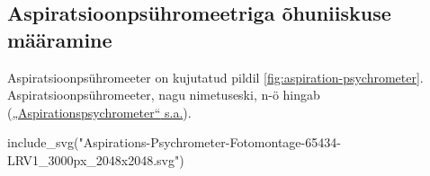 \documentclass[
  12pt,
  a4paper,
  onecolumn, twoside]{article}
\newenvironment{Shaded}{\begin{snugshade}}{\end{snugshade}}
\newcommand{\FunctionTok}[1]{\textcolor[rgb]{0.00,0.00,0.00}{#1}}
\newcommand{\NormalTok}[1]{#1}
\newcommand{\StringTok}[1]{\textcolor[rgb]{0.31,0.60,0.02}{#1}}
\begin{document}
\hypertarget{aspiratsioonpsuxfchromeetriga-uxf5huniiskuse-muxe4uxe4ramine}{%
\subsection{Aspiratsioonpsühromeetriga õhuniiskuse määramine}\label{aspiratsioonpsuxfchromeetriga-uxf5huniiskuse-muxe4uxe4ramine}}

Aspiratsioonpsühromeeter on kujutatud pildil \ref{fig:aspiration-psychrometer}. Aspiratsioonpsühromeeter, nagu nimetuseski, n-ö hingab (\protect\hyperlink{ref-aspirationspsychrometer}{{„Aspirationspsychrometer``} s.a.}).



\begin{Shaded}
\begin{Highlighting}[numbers=left,,]
\FunctionTok{include\_svg}\NormalTok{(}\StringTok{"Aspirations{-}Psychrometer{-}Fotomontage{-}65434{-}LRV1\_3000px\_2048x2048.svg"}\NormalTok{)}
\end{Highlighting}
\end{Shaded}
\end{document}
